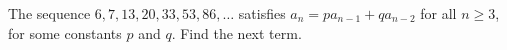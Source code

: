 The sequence $6,7,13,20,33,53,86,\dots$ satisfies $a_n=pa_{n-1}+qa_{n-2}$ for all $n\ge3$, for some constants $p$ and $q$. Find the next term.
